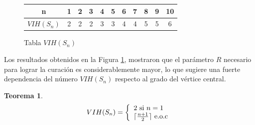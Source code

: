 \documentclass[12pt,titlepage,twoside,openright]{book}
\newtheorem{theorem}{Teorema}[section]
\begin{document}
\begin{figure}[h!]
    \centering
    \begin{tabular}{|c|cccccccccc|}

        \hline
        \textbf{n} & \textbf{1} & \textbf{2} & \textbf{3} & \textbf{4} & \textbf{5} & \textbf{6} & \textbf{7} & \textbf{8} & \textbf{9} & \textbf{10}\\
        \hline
        \textbf{$VIH(S_n)$} & 2 & 2 & 2 & 3 & 3 & 4 & 4 & 5 & 5 & 6 \\
        \hline
    \end{tabular}
    \caption{Tabla $VIH(S_n)$}
    \label{tabla:VIH(S_n)}
\end{figure}
Los resultados obtenidos en la Figura \ref{tabla:VIH(S_n)}, mostraron que el par\'ametro $R$ necesario para lograr la curaci\'on es considerablemente mayor, lo que sugiere una fuerte dependencia del n\'umero $VIH(S_n)$ respecto al grado del v\'ertice central. 
\begin{theorem}\label{Teo:VIH(Sn)}
    $$
    VIH(S_n) = \left\lbrace
    \begin{array}{ll}
        2 \textup{ si } n = 1\\
        \lceil \frac{n+1}{2} \rceil \textup{ e.o.c}
    \end{array}
    \right.
    $$
\end{theorem}
\end{document}

